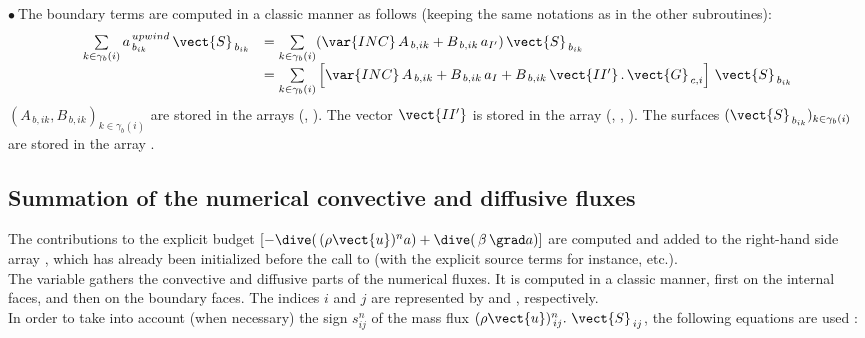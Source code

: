 $\bullet \ $The boundary terms are computed in a classic manner as follows (keeping the same notations as in the other subroutines):
\begin{equation}\notag
\begin{array}{ll}
\sum\limits_{k\in {\gamma_b(i)}}a^{\,upwind}_{\,b_{ik}}\,\vect{S}_{\,{b}_{ik}}
& = \sum\limits_{k\in {\gamma_b(i)}}(\var{INC}\,A_{\,b,ik} + B_{\,b,ik}\,a_{I'})\,\vect{S}_{\,{b}_{ik}}\\
&=\sum\limits_{k\in {\gamma_b(i)}}\left[ \var{INC}\,A_{\,b,ik} +
B_{\,b,ik}\,a_{I} + B_{\,b,ik}\,\vect {II'}\,.\,\vect{G}_{\,c,i}
\right]\,\vect{S}_{\,{b}_{ik}}
\end{array}
\end{equation}
$(A_{\,b,ik},
B_{\,b,ik})_{k\in {\gamma_b(i)}}$ are stored in the arrays (, ). The vector  $\vect{II'}$ is stored in the array (, ,
). The surfaces  $(\vect{S}_{\,{b}_{ik}})_{k\in {\gamma_b(i)}}$ are stored in the array  .

\subsection*{\bf Summation of the numerical convective and diffusive fluxes}
The contributions to the explicit budget $[-\dive(\,(\rho \vect{u})^{n}a)
+\dive(\,\beta\,\grad a)]$ are computed and added to the right-hand side array ,
which has already been initialized before the call to
 (with the explicit source terms for instance, etc.).\\
The variable  gathers the convective and diffusive parts of the numerical fluxes. It is computed in a classic manner, first on the internal faces, and then on the boundary faces.
The indices $i$ and $j$ are represented by  and , respectively.\\
In order to take into account (when necessary) the sign $s^n_{ij}$ of
the mass flux $(\rho\vect{u})_{\,ij}^n.\ \vect{S}_{\,ij}$, the following equations are used :

